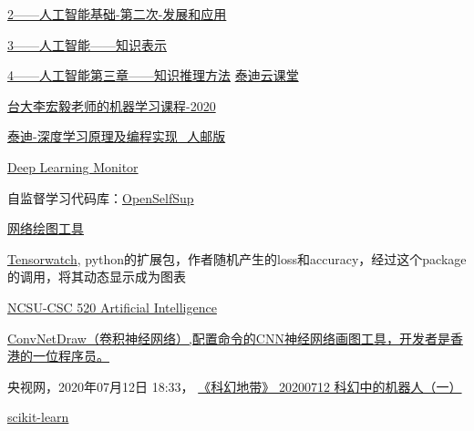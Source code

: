 \begin{pre}
\href{https://ke.qq.com/webcourse/index.html?cid=1086628&term_id=101182654&lite=1&from=800021724#taid=8423279&vid=5285890799803709554}{2——人工智能基础-第二次-发展和应用}

\href{https://github.com/zggl/AITeachingPlanDraft2020/blob/master/3-\%E4\%BA\%BA\%E5\%B7\%A5\%E6\%99\%BA\%E8\%83\%BD\%E7\%AC\%AC\%E4\%BA\%8C\%E7\%AB\%A0\%E7\%AC\%AC\%E4\%B8\%80\%E6\%AC\%A1\%E5\%B9\%BB\%E7\%81\%AF\%20\%E4\%BA\%BA\%E5\%B7\%A5\%E6\%99\%BA\%E8\%83\%BD\%E7\%9A\%84\%E7\%9F\%A5\%E8\%AF\%86\%E8\%A1\%A8\%E7\%A4\%BA.pdf}{3——人工智能——知识表示}

\href{https://github.com/zggl/AITeachingPlanDraft2020/blob/master/4-\%E4\%BA\%BA\%E5\%B7\%A5\%E6\%99\%BA\%E8\%83\%BD\%E7\%AC\%AC\%E4\%B8\%89\%E7\%AB\%A0\%E7\%AC\%AC\%E4\%B8\%80\%E6\%AC\%A1\%20\%E4\%BA\%BA\%E5\%B7\%A5\%E6\%99\%BA\%E8\%83\%BD\%E7\%9A\%84\%E7\%9F\%A5\%E8\%AF\%86\%E6\%8E\%A8\%E7\%90\%86\%E6\%96\%B9\%E6\%B3\%95.pdf}{4——人工智能第三章——知识推理方法}
\href{https://edu.tipdm.org/notification?id=32302}{泰迪云课堂}

\href{http://speech.ee.ntu.edu.tw/~tlkagk/courses_ML20.html}{台大李宏毅老师的机器学习课程-2020}

\href{https://edu.tipdm.org/classroom/122/courses}{泰迪-深度学习原理及编程实现\_人邮版}


\href{https://deeplearn.org/}{Deep Learning Monitor}

自监督学习代码库：\href{https://github.com/open-mmlab/OpenSelfSup}{OpenSelfSup}

\href{http://alexlenail.me/NN-SVG/}{网络绘图工具}

\href{https://github.com/microsoft/tensorwatch}{Tensorwatch}, python的扩展包，作者随机产生的loss和accuracy，经过这个package的调用，将其动态显示成为图表

\href{https://www.engineeringonline.ncsu.edu/course/csc-520-artificial-intelligence-i/}{NCSU-CSC 520 Artificial Intelligence}

\href{https://cbovar.github.io/ConvNetDraw/}{ConvNetDraw（卷积神经网络）,配置命令的CNN神经网络画图工具，开发者是香港的一位程序员。}

央视网，2020年07月12日 18:33， \href{https://tv.cctv.com/2020/07/12/VIDE97wmdEMDFTuh2C9XaSOL200712.shtml?spm=C53121759377.Pxm23GSMKB13.0.0}{《科幻地带》 20200712 科幻中的机器人（一）}

\href{https://scikit-learn.org/stable/about.html#citing-scikit-learn}{scikit-learn}


\end{pre}
